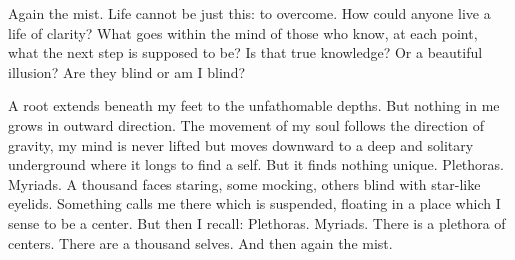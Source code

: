 \documentclass[a4paper, 12pt]{article}
\begin{document}
Again the mist. Life cannot be just this: to overcome. How could anyone live a
life of clarity? What goes within the mind of those who know, at each point,
what the next step is supposed to be? Is that true knowledge? Or a beautiful
illusion? Are they blind or am I blind? 

A root extends beneath my feet to the unfathomable depths. But nothing in me
grows in outward direction. The movement of my soul follows the direction of
gravity, my mind is never lifted but moves downward to a deep and solitary
underground where it longs to find a self. But it finds nothing unique.
Plethoras. Myriads. A thousand faces staring, some mocking, others blind with
star-like eyelids. Something calls me there which is suspended, floating in a
place which I sense to be a center. But then I recall: Plethoras. Myriads. There
is a plethora of centers. There are a thousand selves. And then again the mist.
\end{document}
